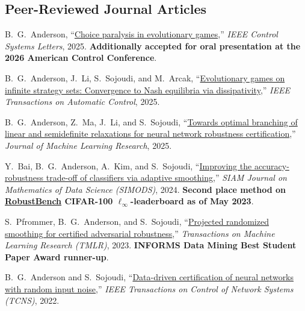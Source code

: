 \vspace*{\subsectionskip}

\subsection{Peer-Reviewed Journal Articles}

\begin{enumerate}[label={[\arabic*]}]
	\item B.\ G.\ Anderson, ``\href{https://arxiv.org/pdf/2509.10567}{Choice paralysis in evolutionary games},'' \textit{IEEE Control Systems Letters}, 2025. \textbf{Additionally accepted for oral presentation at the 2026 American Control Conference}.
	\item B.\ G.\ Anderson, J.\ Li, S.\ Sojoudi, and M.\ Arcak, ``\href{https://arxiv.org/pdf/2312.08286}{Evolutionary games on infinite strategy sets: Convergence to {N}ash equilibria via dissipativity},'' \textit{IEEE Transactions on Automatic Control}, 2025.
	\item B.\ G.\ Anderson, Z.\ Ma, J.\ Li, and S.\ Sojoudi, ``\href{https://jmlr.org/papers/volume26/21-0068/21-0068.pdf}{Towards optimal branching of linear and semidefinite relaxations for neural network robustness certification},'' \textit{Journal of Machine Learning Research}, 2025.
	\item Y.\ Bai, B.\ G.\ Anderson, A.\ Kim, and S.\ Sojoudi, ``\href{https://arxiv.org/pdf/2301.12554.pdf}{Improving the accuracy-robustness trade-off of classifiers via adaptive smoothing},'' \textit{SIAM Journal on Mathematics of Data Science (SIMODS)}, 2024. \textbf{Second place method on \href{https://robustbench.github.io/\#div_cifar100_Linf_heading}{RobustBench} CIFAR-100 $\ell_\infty$-leaderboard as of May 2023}.
	\item S.\ Pfrommer, B.\ G.\ Anderson, and S.\ Sojoudi, ``\href{https://arxiv.org/pdf/2309.13794.pdf}{Projected randomized smoothing for certified adversarial robustness},'' \textit{Transactions on Machine Learning Research (TMLR)}, 2023. \textbf{INFORMS Data Mining Best Student Paper Award runner-up}.
	\item B.\ G.\ Anderson and S.\ Sojoudi, ``\href{https://brendon-anderson.github.io/files/publications/anderson2022data-long.pdf}{Data-driven certification of neural networks with random input noise},'' \textit{IEEE Transactions on Control of Network Systems (TCNS)}, 2022.
\end{enumerate}

\vspace*{\subsectionskip}

